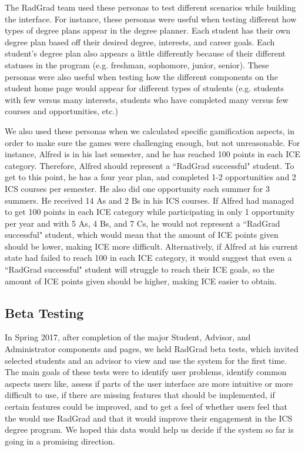 The RadGrad team used these personas to test different scenarios while building the interface. For instance, these personas were useful when testing different how types of degree plans appear in the degree planner. Each student has their own degree plan based off their desired degree, interests, and career goals. Each student's degree plan also appears a little differently because of their different statuses in the program (e.g. freshman, sophomore, junior, senior). These personas were also useful when testing how the different components on the student home page would appear for different types of students (e.g. students with few versus many interests, students who have completed many versus few courses and opportunities, etc.) 

We also used these personas when we calculated specific gamification aspects, in order to make sure the games were challenging enough, but not unreasonable. For instance, Alfred is in his last semester, and he has reached 100 points in each ICE category. Therefore, Alfred should represent a ``RadGrad successful" student. To get to this point, he has a four year plan, and completed 1-2 opportunities and 2 ICS courses per semester. He also did one opportunity each summer for 3 summers. He received 14 As and 2 Bs in his ICS courses. If Alfred had managed to get 100 points in each ICE category while participating in only 1 opportunity per year and with 5 As, 4 Bs, and 7 Cs, he would not represent a ``RadGrad successful" student, which would mean that the amount of ICE points given should be lower, making ICE more difficult. Alternatively, if Alfred at his current state had failed to reach 100 in each ICE category, it would suggest that even a ``RadGrad successful" student will struggle to reach their ICE goals, so the amount of ICE points given should be higher, making ICE easier to obtain.
 
\subsection{Beta Testing}

In Spring 2017, after completion of the major Student, Advisor, and Administrator components and pages, we held RadGrad beta tests, which invited selected students and an advisor to view and use the system for the first time. The main goals of these tests were to identify user problems, identify common aspects users like, assess if parts of the user interface are more intuitive or more difficult to use, if there are missing features that should be implemented, if certain features could be improved, and to get a feel of whether users feel that the would use RadGrad and that it would improve their engagement in the ICS degree program. We hoped this data would help us decide if the system so far is going in a promising direction.

